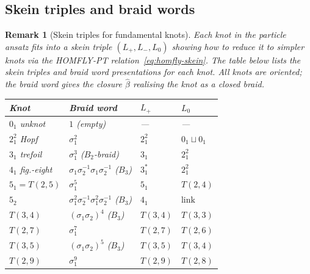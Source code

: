 \documentclass[12pt,a4paper]{report}
\newtheorem{remark}[theorem]{Remark}
\providecommand{\DIFaddtex}[1]{{\protect\color{DIFgreen} \sf #1}} %
\providecommand{\DIFadd}[1]{\texorpdfstring{\DIFaddtex{#1}}{#1}} %
\begin{document}
\subsection{\DIFadd{Skein triples and braid words}}
\DIFadd{\label{subsec:skein-triples}
}

\begin{remark}[Skein triples for fundamental knots]
\DIFadd{\label{rem:skein-triples}
Each knot in the particle ansatz fits into a skein triple
$(L_+, L_-, L_0)$ showing how to reduce it to simpler knots via the
HOMFLY-PT relation~\eqref{eq:homfly-skein}.  The table below lists the
skein triples and braid word presentations for each knot.  All knots
are oriented; the braid word gives the closure $\hat\beta$ realising the
knot as a closed braid.
}

\medskip
{\renewcommand{\arraystretch}{1.4}
\noindent\begin{tabular}{llll}
\hline
\DIFadd{\textbf{Knot} }& \DIFadd{\textbf{Braid word} }& \DIFadd{\textbf{$L_+$} }& \DIFadd{\textbf{$L_0$} }\\
\hline
\DIFadd{$0_1$ unknot
  }& \DIFadd{$1$ (empty)
  }& \DIFadd{---
  }& \DIFadd{--- }\\[2pt]
\DIFadd{$2^2_1$ Hopf
  }& \DIFadd{$\sigma_1^2$
  }& \DIFadd{$2^2_1$
  }& \DIFadd{$0_1 \sqcup 0_1$ }\\[2pt]
\DIFadd{$3_1$ trefoil
  }& \DIFadd{$\sigma_1^3$ ($B_2$-braid)
  }& \DIFadd{$3_1$
  }& \DIFadd{$2^2_1$ }\\[2pt]
\DIFadd{$4_1$ fig.-eight
  }& \DIFadd{$\sigma_1\sigma_2^{-1}\sigma_1\sigma_2^{-1}$ ($B_3$)
  }& \DIFadd{$3_1^*$
  }& \DIFadd{$2^2_1$ }\\[2pt]
\DIFadd{$5_1 = T(2,5)$
  }& \DIFadd{$\sigma_1^5$
  }& \DIFadd{$5_1$
  }& \DIFadd{$T(2,4)$ }\\[2pt]
\DIFadd{$5_2$
  }& \DIFadd{$\sigma_1^2\sigma_2^{-1}\sigma_1^2\sigma_2^{-1}$ ($B_3$)
  }& \DIFadd{$4_1$
  }& \DIFadd{$\text{link}$ }\\[2pt]
\DIFadd{$T(3,4)$
  }& \DIFadd{$(\sigma_1\sigma_2)^4$ ($B_3$)
  }& \DIFadd{$T(3,4)$
  }& \DIFadd{$T(3,3)$ }\\[2pt]
\DIFadd{$T(2,7)$
  }& \DIFadd{$\sigma_1^7$
  }& \DIFadd{$T(2,7)$
  }& \DIFadd{$T(2,6)$ }\\[2pt]
\DIFadd{$T(3,5)$
  }& \DIFadd{$(\sigma_1\sigma_2)^5$ ($B_3$)
  }& \DIFadd{$T(3,5)$
  }& \DIFadd{$T(3,4)$ }\\[2pt]
\DIFadd{$T(2,9)$
  }& \DIFadd{$\sigma_1^9$
  }& \DIFadd{$T(2,9)$
  }& \DIFadd{$T(2,8)$ }\\[2pt]
\hline
\end{tabular}}
\end{remark}
\end{document}
